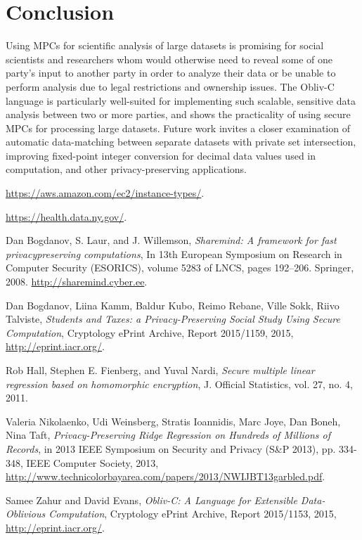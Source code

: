 \documentclass[conference]{IEEEtran}
\begin{document}
\section{Conclusion}
Using MPCs for scientific analysis of large datasets is promising for social scientists
and researchers whom would otherwise need to reveal some of one party's input to another
party in order to analyze their data or be unable to perform analysis due to legal restrictions and ownership issues. 
The Obliv-C language is particularly well-suited for implementing such scalable, 
sensitive data analysis between two or more parties, and shows the practicality of 
using secure MPCs for processing large datasets.
Future work invites a closer examination of automatic data-matching between
separate datasets with private set intersection, improving fixed-point integer 
conversion for decimal data values used in computation, and other privacy-preserving
applications.

\begin{thebibliography}{1}

  \url{https://aws.amazon.com/ec2/instance-types/}.

  \url{https://health.data.ny.gov/}.

Dan Bogdanov, S. Laur, and J. Willemson,
\emph{Sharemind: A framework for fast privacypreserving
computations}, In 13th European Symposium on Research in Computer
Security (ESORICS), volume 5283 of LNCS, pages 192–206. Springer, 2008.
\url{http://sharemind.cyber.ee}.

    Dan Bogdanov, Liina Kamm, Baldur Kubo, Reimo Rebane, Ville Sokk, Riivo Talviste,
    \emph{Students and Taxes: a Privacy-Preserving Social Study Using Secure Computation},
    Cryptology ePrint Archive, Report 2015/1159,
    2015,
    \url{http://eprint.iacr.org/}.

  Rob Hall, Stephen E. Fienberg, and Yuval Nardi, 
  \emph{Secure multiple linear regression based on homomorphic encryption}, 
  J. Official Statistics, vol. 27, no. 4, 2011.

 Valeria Nikolaenko, Udi Weinsberg, Stratis Ioannidis, Marc Joye, Dan Boneh, Nina Taft,
 \emph{Privacy-Preserving Ridge Regression on Hundreds of Millions of Records},
 in 2013 IEEE Symposium on Security and Privacy (S\&P 2013), pp. 334-348, 
 IEEE Computer Society, 2013,
 \url{http://www.technicolorbayarea.com/papers/2013/NWIJBT13garbled.pdf}.

  Samee Zahur and David Evans, \emph{Obliv-C: A Language for Extensible 
  Data-Oblivious Computation}, Cryptology ePrint Archive, 
  Report 2015/1153, 2015, 
  \url{http://eprint.iacr.org/}.

\end{thebibliography}
\end{document}
